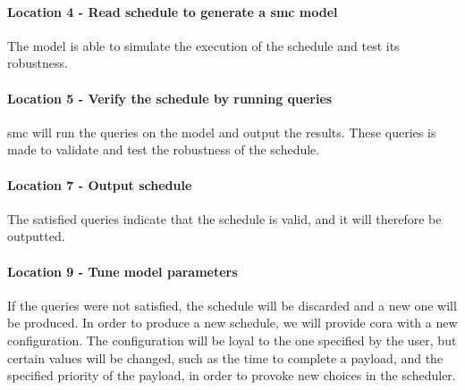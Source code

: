 \paragraph{Location 4 - Read schedule to generate a \gls{smc} model}
The model is able to simulate the execution of the schedule and test its robustness.

\paragraph{Location 5 - Verify the schedule by running queries} 
\gls{smc} will run the queries on the model and output the results.
These queries is made to validate and test the robustness of the schedule.

\paragraph{Location 7 - Output schedule} 
The satisfied queries indicate that the schedule is valid, and it will therefore be outputted.

\paragraph{Location 9 - Tune model parameters} 
If the queries were not satisfied, the schedule will be discarded and a new one will be produced.
In order to produce a new schedule, we will provide \gls{cora} with a new configuration.
The configuration will be loyal to the one specified by the user, but certain values will be changed, such as the time to complete a payload, and the specified priority of the payload, in order to provoke new choices in the scheduler.
